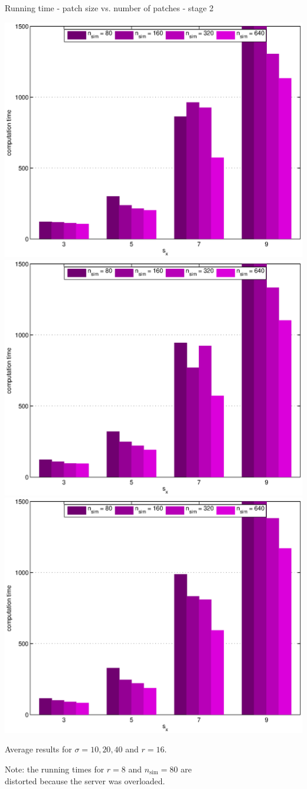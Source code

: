 \documentclass[mathserif, 8pt]{beamer}
\begin{document}
\begin{frame}{Running time - patch size vs. number of patches - stage 2}
	\begin{center}
		\includegraphics[width=.33\textwidth]{time_px2-np2-bars_2r16_s10_average.eps}%
		\includegraphics[width=.33\textwidth]{time_px2-np2-bars_2r16_s20_average.eps}%
		\includegraphics[width=.33\textwidth]{time_px2-np2-bars_2r16_s40_average.eps}
	\end{center}
	\begin{center}
	Average results for $\sigma = 10, 20, 40$ and $r = 16$.

	\bigskip

	Note: the running times for $r = 8$ and $n_{\text{sim}} = 80$ are \\
	distorted because the server was overloaded.
	\end{center}
\end{frame}
\end{document}
